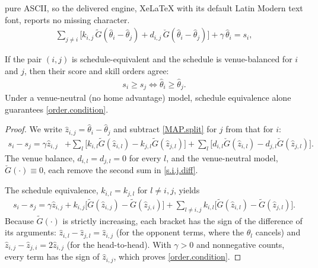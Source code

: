 \documentclass[10pt,a4paper]{amsart}
\newcommand{\cd}{\cdot}
\begin{document}
pure ASCII, so the delivered engine, XeLaTeX with its default Latin Modern text font, reports no missing character.
\begin{align}
\label{MAP.split}
    \sum_{j\neq i}\bigl[
    k_{i,j}\,\tilde G(\hat\theta_i-\hat\theta_j)
    + d_{i,j}\,\check G(\hat\theta_i-\hat\theta_j)\bigr]
    + \gamma\,\hat\theta_i
    = s_i,
\end{align}

\begin{proposition}\label{Prop:score.ranking.balanced}
If the pair $(i,j)$ is schedule-equivalent and the schedule is venue-balanced for $i$ and $j$, then their score and skill orders agree:
\begin{align}
\label{order.condition}
    s_i\ge s_j\iff\hat\theta_i\ge\hat\theta_j.
\end{align}
Under a venue-neutral (no home advantage) model, schedule equivalence alone guarantees \eqref{order.condition}.
\end{proposition}

\begin{proof}
We write $\hat z_{i,j}=\hat\theta_i - \hat\theta_j$ and subtract \eqref{MAP.split} for $j$ from that for $i$:
\begin{align}
\label{s.i.j.diff}
    s_i-s_j=\gamma\hat z_{i,j}
    &+\sum_l\bigl[k_{i,l}\tilde G(\hat z_{i,l})-k_{j,l}\tilde G(\hat z_{j,l})\bigr]
    +\sum_l\bigl[d_{i,l}\check G(\hat z_{i,l})-d_{j,l}\check G(\hat z_{j,l})\bigr].
\end{align}
The venue balance, $d_{i,l}=d_{j,l}=0$ for every $l$, and the venue-neutral model, $\check G(\cd)\equiv0$, each remove the second sum in \eqref{s.i.j.diff}.

The schedule equivalence, $k_{i,l}=k_{j,l}$ for $l\ne i,j$, yields
\begin{align*}
    s_i-s_j=\gamma\hat z_{i,j}+k_{i,j}\bigl[\tilde G(\hat z_{i,j})-\tilde G(\hat z_{j,i})\bigr]
    +\sum_{l\ne i,j}k_{i,l}\bigl[\tilde G(\hat z_{i,l})-\tilde G(\hat z_{j,l})\bigr].
\end{align*}
Because $\tilde G(\cd)$ is strictly increasing, each bracket has the sign of the difference of its arguments: $\hat z_{i,l}-\hat z_{j,l}=\hat z_{i,j}$ (for the opponent terms, where the $\hat\theta_l$ cancels) and $\hat z_{i,j}-\hat z_{j,i}=2\hat z_{i,j}$ (for the head-to-head). With $\gamma>0$ and nonnegative counts, every term has the sign of $\hat{z}_{i,j}$, which proves \eqref{order.condition}. 
\end{proof}
\end{document}
